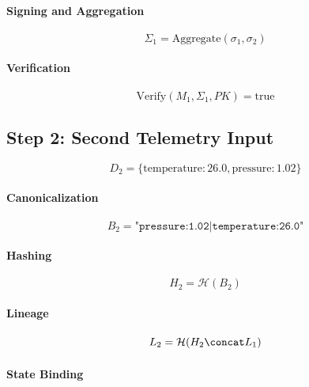 \paragraph{Signing and Aggregation}

\begin{equation}
\Sigma_1 = \text{Aggregate}(\sigma_1, \sigma_2)
\end{equation}

\paragraph{Verification}

\begin{equation}
\text{Verify}(M_1, \Sigma_1, PK) = \text{true}
\end{equation}

\subsection{Step 2: Second Telemetry Input}

\begin{equation}
D_2 = \{\text{temperature}: 26.0, \text{pressure}: 1.02\}
\end{equation}

\paragraph{Canonicalization}

\begin{equation}
B_2 = \texttt{"pressure:1.02|temperature:26.0"}
\end{equation}

\paragraph{Hashing}

\begin{equation}
H_2 = \mathcal{H}(B_2)
\end{equation}

\paragraph{Lineage}

\begin{equation}
L_2 = \mathcal{H}(H_2 \concat L_1)
\end{equation}

\paragraph{State Binding}

